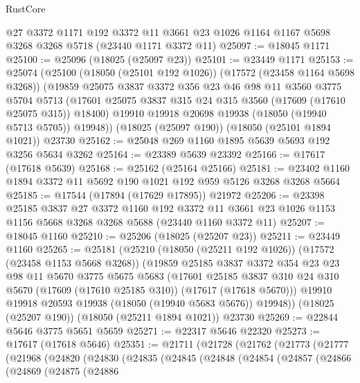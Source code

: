 \begin{lexlean}{RustCore}
\begin{coremodule}
    @27
    @3372
    @1171
    @192
    @3372
    @11
    @3661
    @23
    @1026
    @1164
    @1167
    @5698
    @3268
    @3268
    @5718
    (@23440 @1171 @3372 @11)
@25097 := @18045 @1171
@25100 := @25096 (@18025 (@25097 @23))
@25101 := @23449 @1171
@25153 := @25074
    (@25100
      (@18050 (@25101 @192 @1026))
      (@17572 (@23458 @1164 @5698 @3268))
      (@19859
        @25075
        @3837
        @3372
        @356
        @23
        @46
        @98
        @11
        @3560
        @3775
        @5704
        @5713
        (@17601 @25075 @3837 @315 @24 @315 @3560 (@17609 (@17610 @25075 @315)) @18400)
        @19910
        @19918
        @20698
        @19938
        (@18050 (@19940 @5713 @5705))
        @19948))
    (@18025 (@25097 @190))
    (@18050 (@25101 @1894 @1021))
    @23730
@25162 := @25048 @269 @1160 @1895 @5639 @5693 @192 @3256 @5634 @3262
@25164 := @23389 @5639 @23392
@25166 := @17617 (@17618 @5639)
@25168 := @25162 (@25164 @25166)
@25181 := @23402 @1160 @1894 @3372 @11 @5692 @190 @1021 @192 @959 @5126 @3268 @3268 @5664
@25185 := @17544 (@17894 (@17629 @17895)) @21972
@25206 := @23398
    @25185
    @3837
    @27
    @3372
    @1160
    @192
    @3372
    @11
    @3661
    @23
    @1026
    @1153
    @1156
    @5668
    @3268
    @3268
    @5688
    (@23440 @1160 @3372 @11)
@25207 := @18045 @1160
@25210 := @25206 (@18025 (@25207 @23))
@25211 := @23449 @1160
@25265 := @25181
    (@25210
      (@18050 (@25211 @192 @1026))
      (@17572 (@23458 @1153 @5668 @3268))
      (@19859
        @25185
        @3837
        @3372
        @354
        @23
        @23
        @98
        @11
        @5670
        @3775
        @5675
        @5683
        (@17601
          @25185
          @3837
          @310
          @24
          @310
          @5670
          (@17609 (@17610 @25185 @310))
          (@17617 (@17618 @5670)))
        @19910
        @19918
        @20593
        @19938
        (@18050 (@19940 @5683 @5676))
        @19948))
    (@18025 (@25207 @190))
    (@18050 (@25211 @1894 @1021))
    @23730
@25269 := @22844 @5646 @3775 @5651 @5659
@25271 := @22317 @5646 @22320
@25273 := @17617 (@17618 @5646)
@25351 := @21711
    (@21728
      (@21762
        (@21773
          (@21777
            (@21968
              (@24820
                (@24830
                  (@24835
                    (@24845
                      (@24848
                        (@24854
                          (@24857
                            (@24866
                              (@24869
                                (@24875
                                  (@24886

\end{coremodule}
\end{lexlean}
